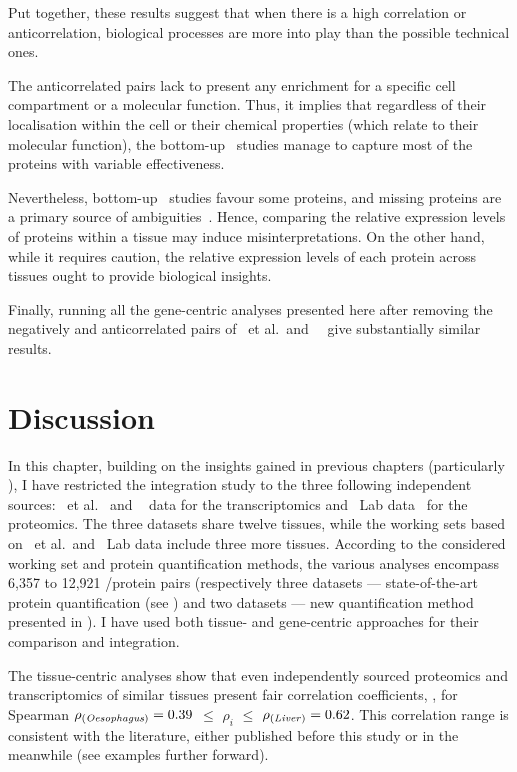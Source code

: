 Put together, these results suggest that
when there is a high correlation or anticorrelation,
biological processes are more into play than the possible technical ones.

The anticorrelated pairs lack to present any enrichment
for a specific cell compartment or a molecular function.
Thus, it implies that
regardless of their localisation within the cell
or their chemical properties (which relate to their molecular function),
the bottom-up \ms\ studies manage to capture most of the proteins
with variable effectiveness.

Nevertheless, bottom-up \ms\ studies favour some proteins,
and missing proteins are a primary source of ambiguities~.
Hence, comparing the relative expression levels of proteins within a tissue
may induce misinterpretations.
On the other hand, while it requires caution,
the relative expression levels of each protein across tissues
ought to provide biological insights.

Finally, running all the gene-centric analyses presented here
after removing the negatively and anticorrelated pairs of \uhlen\ et al.\ and
\gtex\ \mRNAs\ give substantially similar results.

\section{Discussion}

In this chapter,
building on the insights gained in previous chapters
(particularly ),
I have restricted the integration study to
the three following independent sources:
\uhlen\ et al.~
and \gtex~ data for the transcriptomics
and \pandey\ Lab data~ for the proteomics.
The three datasets share twelve tissues,
while the working sets based on \uhlen\ et al.\ and \pandey\ Lab data
include three more tissues.
According to the considered working set and protein quantification methods,
the various analyses encompass 6,357 to 12,921 \mRNA/protein pairs
(respectively
three datasets --- state-of-the-art protein quantification (see )
and two datasets --- new quantification method presented in ).
I have used both tissue- and gene-centric approaches
for their comparison and integration.\mybr\

The tissue-centric analyses show that
even independently sourced proteomics and transcriptomics of similar tissues
present fair correlation coefficients,
\eg, for Spearman $\rho_{\text{(\emph{Oesophagus})}}=0.39$
$≤$ $\rho_i$ $≤$ $\rho_{\text{(\emph{Liver})}}=0.62$.
This correlation range is consistent with the literature,
either published before this study or in the meanwhile (see examples further forward).

